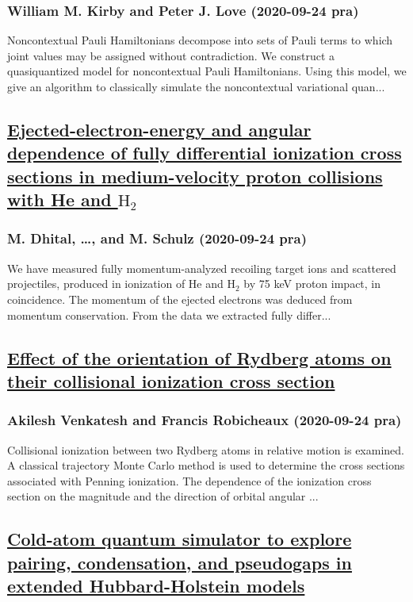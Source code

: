 \subsubsection*{William M. Kirby and Peter J. Love (2020-09-24 pra)}
Noncontextual Pauli Hamiltonians decompose into sets of Pauli terms to which joint values may be assigned without contradiction. We construct a quasiquantized model for noncontextual Pauli Hamiltonians. Using this model, we give an algorithm to classically simulate the noncontextual variational quan...
\subsection*{\href{http://link.aps.org/doi/10.1103/PhysRevA.102.032818}{Ejected-electron-energy and angular dependence of fully differential ionization cross sections in medium-velocity proton collisions with He and ${\mathrm{H}}_{2}$}}
\subsubsection*{M. Dhital, \dots, and M. Schulz (2020-09-24 pra)}
We have measured fully momentum-analyzed recoiling target ions and scattered projectiles, produced in ionization of He and ${\mathrm{H}}_{2}$ by 75 keV proton impact, in coincidence. The momentum of the ejected electrons was deduced from momentum conservation. From the data we extracted fully differ...
\subsection*{\href{http://link.aps.org/doi/10.1103/PhysRevA.102.032819}{Effect of the orientation of Rydberg atoms on their collisional ionization cross section}}
\subsubsection*{Akilesh Venkatesh and Francis Robicheaux (2020-09-24 pra)}
Collisional ionization between two Rydberg atoms in relative motion is examined. A classical trajectory Monte Carlo method is used to determine the cross sections associated with Penning ionization. The dependence of the ionization cross section on the magnitude and the direction of orbital angular ...
\subsection*{\href{http://link.aps.org/doi/10.1103/PhysRevA.102.033333}{Cold-atom quantum simulator to explore pairing, condensation, and pseudogaps in extended Hubbard-Holstein models}}
